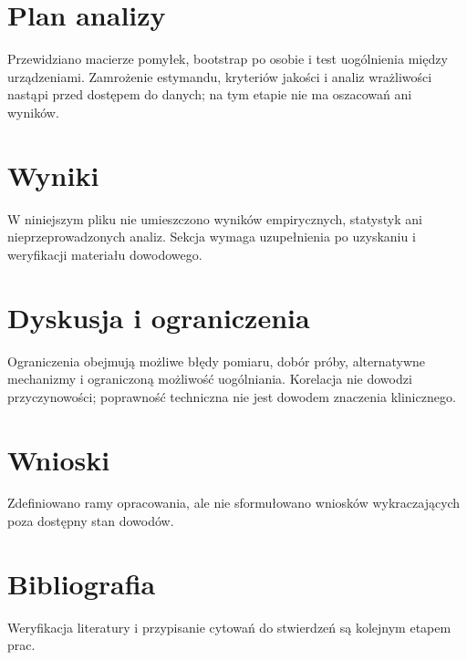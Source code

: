 \documentclass[11pt,a4paper]{article}
\begin{document}
\section{Plan analizy}

Przewidziano macierze pomyłek, bootstrap po osobie i test uogólnienia między urządzeniami. Zamrożenie estymandu, kryteriów jakości i analiz wrażliwości nastąpi przed dostępem do danych; na tym etapie nie ma oszacowań ani wyników.

\section{Wyniki}

W niniejszym pliku nie umieszczono wyników empirycznych, statystyk ani nieprzeprowadzonych analiz. Sekcja wymaga uzupełnienia po uzyskaniu i weryfikacji materiału dowodowego.

\section{Dyskusja i ograniczenia}

Ograniczenia obejmują możliwe błędy pomiaru, dobór próby, alternatywne mechanizmy i ograniczoną możliwość uogólniania. Korelacja nie dowodzi przyczynowości; poprawność techniczna nie jest dowodem znaczenia klinicznego.

\section{Wnioski}

Zdefiniowano ramy opracowania, ale nie sformułowano wniosków wykraczających poza dostępny stan dowodów.

\section*{Bibliografia}

Weryfikacja literatury i przypisanie cytowań do stwierdzeń są kolejnym etapem prac.
\end{document}
